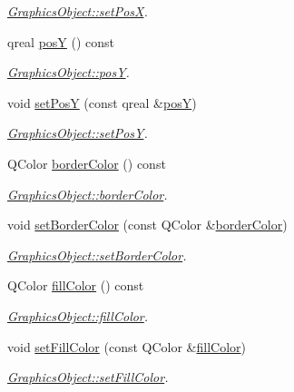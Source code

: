 \begin{DoxyCompactItemize}
\begin{DoxyCompactList}\small\item\em \hyperlink{class_graphics_object_ac355db089d870d194e5961921d5626e3}{Graphics\+Object\+::set\+PosX}. \end{DoxyCompactList}\item 
qreal \hyperlink{class_graphics_object_adfd441f0d80339456482cc71355ba429}{posY} () const
\begin{DoxyCompactList}\small\item\em \hyperlink{class_graphics_object_adfd441f0d80339456482cc71355ba429}{Graphics\+Object\+::posY}. \end{DoxyCompactList}\item 
void \hyperlink{class_graphics_object_ab450d85cfafd5eb80c2ce75784e13088}{set\+PosY} (const qreal \&\hyperlink{class_graphics_object_adfd441f0d80339456482cc71355ba429}{posY})
\begin{DoxyCompactList}\small\item\em \hyperlink{class_graphics_object_ab450d85cfafd5eb80c2ce75784e13088}{Graphics\+Object\+::set\+PosY}. \end{DoxyCompactList}\item 
Q\+Color \hyperlink{class_graphics_object_a2d1ae6917ba3a02c305ce48f04e4aa65}{border\+Color} () const
\begin{DoxyCompactList}\small\item\em \hyperlink{class_graphics_object_a2d1ae6917ba3a02c305ce48f04e4aa65}{Graphics\+Object\+::border\+Color}. \end{DoxyCompactList}\item 
void \hyperlink{class_graphics_object_a23b8350a123074dfcd5b3807bda06487}{set\+Border\+Color} (const Q\+Color \&\hyperlink{class_graphics_object_a2d1ae6917ba3a02c305ce48f04e4aa65}{border\+Color})
\begin{DoxyCompactList}\small\item\em \hyperlink{class_graphics_object_a23b8350a123074dfcd5b3807bda06487}{Graphics\+Object\+::set\+Border\+Color}. \end{DoxyCompactList}\item 
Q\+Color \hyperlink{class_graphics_object_a2575009e9051dc8cd582c23ceb4cebec}{fill\+Color} () const
\begin{DoxyCompactList}\small\item\em \hyperlink{class_graphics_object_a2575009e9051dc8cd582c23ceb4cebec}{Graphics\+Object\+::fill\+Color}. \end{DoxyCompactList}\item 
void \hyperlink{class_graphics_object_a125ba24bcb7f858a20054a9c57ae8a97}{set\+Fill\+Color} (const Q\+Color \&\hyperlink{class_graphics_object_a2575009e9051dc8cd582c23ceb4cebec}{fill\+Color})
\begin{DoxyCompactList}\small\item\em \hyperlink{class_graphics_object_a125ba24bcb7f858a20054a9c57ae8a97}{Graphics\+Object\+::set\+Fill\+Color}. \end{DoxyCompactList}\end{DoxyCompactItemize}


